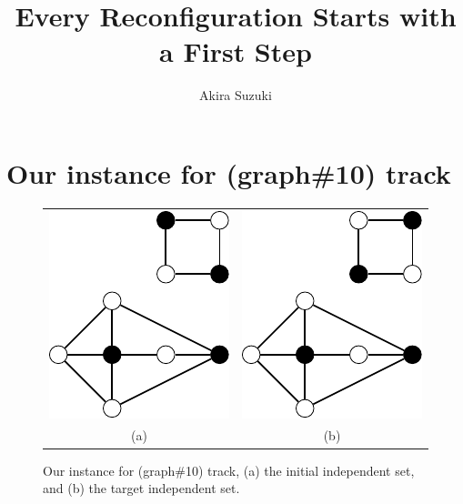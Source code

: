 \documentclass{article}
\date{}
\title{Every Reconfiguration Starts with a First Step}
\author[1]{Akira Suzuki}
\affil[1]{Graduate School of Information Sciences, Tohoku University}
\begin{document}
\maketitle

\section{Our instance for (graph\#10) track}
	\begin{figure}[t]
		\begin{tabular}{cc}
			\begin{minipage}[t]{0.5\hsize}
				\centering
				\includegraphics{10_s.pdf}
			\end{minipage}
		&
			\begin{minipage}[t]{0.5\hsize}
				\centering
				\includegraphics{10_t.pdf}
			\end{minipage}
		\\
		(a)
		&
		(b)
		\end{tabular}
		\caption{Our instance for (graph\#10) track, (a) the initial independent set, and (b) the target independent set.}
		\label{figure_10instance}
	\end{figure}
\end{document}
